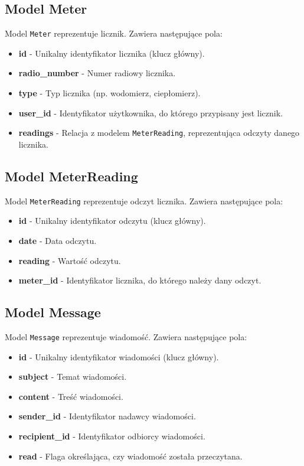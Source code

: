 \documentclass[12pt,a4paper]{report}
\begin{document}
\subsection{Model Meter}
Model \texttt{Meter} reprezentuje licznik. Zawiera następujące pola:
\begin{itemize}
    \item \textbf{id} - Unikalny identyfikator licznika (klucz główny).
    \item \textbf{radio\_number} - Numer radiowy licznika.
    \item \textbf{type} - Typ licznika (np. wodomierz, ciepłomierz).
    \item \textbf{user\_id} - Identyfikator użytkownika, do którego przypisany jest licznik.
    \item \textbf{readings} - Relacja z modelem \texttt{MeterReading}, reprezentująca odczyty danego licznika.
\end{itemize}

\subsection{Model MeterReading}
Model \texttt{MeterReading} reprezentuje odczyt licznika. Zawiera następujące pola:
\begin{itemize}
    \item \textbf{id} - Unikalny identyfikator odczytu (klucz główny).
    \item \textbf{date} - Data odczytu.
    \item \textbf{reading} - Wartość odczytu.
    \item \textbf{meter\_id} - Identyfikator licznika, do którego należy dany odczyt.
\end{itemize}

\subsection{Model Message}
Model \texttt{Message} reprezentuje wiadomość. Zawiera następujące pola:
\begin{itemize}
    \item \textbf{id} - Unikalny identyfikator wiadomości (klucz główny).
    \item \textbf{subject} - Temat wiadomości.
    \item \textbf{content} - Treść wiadomości.
    \item \textbf{sender\_id} - Identyfikator nadawcy wiadomości.
    \item \textbf{recipient\_id} - Identyfikator odbiorcy wiadomości.
    \item \textbf{read} - Flaga określająca, czy wiadomość została przeczytana.
\end{itemize}
\end{document}
